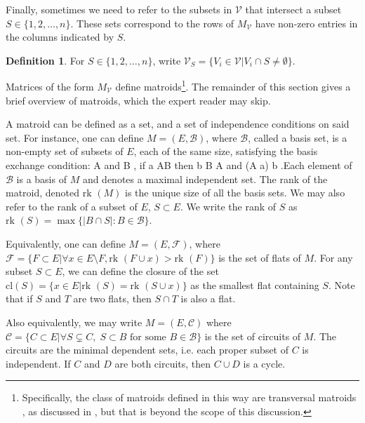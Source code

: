 \documentclass[11pt]{article}
\newcommand{\rk}{\textrm{rk }}
\def\bas #1\eas{\begin{align*} #1 \end{align*}}
\newcommand{\cV}{\mathcal{V}}
\newcommand{\cB}{\mathcal{B}}
\theoremstyle{remark}
\theoremstyle{definition}
\newtheorem{dfn}[thm]{Definition}
\begin{document}
Finally, sometimes we need to refer to the subsets in $\cV$ that intersect a subset  $S \in \{1,2,\dots,n\}$. These sets correspond to the rows of $M_{\cV}$ have non-zero entries in the columns indicated by $S$. 

\begin{dfn}\label{dfn:columns}
For $S \in \{1,2,\dots,n\}$, write $\cV_S =\{V_i \in \cV |  V_i \cap S \neq \emptyset\}$. 
\end{dfn}

Matrices of the form $M_\cV$ define matroids\footnote{Specifically, the class of matroids defined in this way are transversal matroids \cite{Transversal}, as discussed in \cite{basisshapeloci}, but that is beyond the scope of this discussion.}. The remainder of this section gives a brief overview of matroids, which the expert reader may skip. 

A matroid can be defined as a set, and a set of independence conditions on said set. For instance, one can define $M = (E, \mathcal{B})$, where $\mathcal{B}$, called a basis set, is a non-empty set of subsets of $E$, each of the same size, satisfying the basis exchange condition: \bas \textrm{for  all } A \textrm{ and } B \in \cB, \textrm{ if }  a \in A\setminus B \textrm{ then } \exists b \in B \setminus A \textrm{ and } (A \setminus a) \cup b \in  \cB \;.\eas Each element of $$ is a basis of $M$ and denotes a maximal independent set. The rank of the matroid, denoted $\rk(M)$ is the unique size of all the basis sets. We may also refer to the rank of a subset of $E$, $S \subset E$. We write the rank of $S$ as $\rk(S) = \max \{|B \cap S| : B \in \mathcal{B} \}$.%

Equivalently, one can define $M = (E, \mathcal{F})$, where $\mathcal{F} = \{ F \subset E| \forall x \in E \setminus F, \rk(F \cup x) > \rk(F)\}$ is the set of flats of $M$. For any subset $S \subset E$, we can define the closure of the set $\textrm{cl}(S)  = \{x \in E | \rk(S) = \rk(S \cup x)\}$ as the smallest flat containing $S$. Note that if $S$ and $T$ are two flats, then $S \cap T$ is also a flat. 

Also equivalently, we may write $M = (E, \mathcal{C})$ where $\mathcal{C} = \{C \subset E | \forall S \subsetneq C, \; S \subset B \textrm{ for some } B \in \mathcal{B}\}$ is the set of circuits of $M$. The circuits are the minimal dependent sets, i.e. each proper subset of $C$ is independent. If $C$ and $D$ are both circuits, then $C \cup D$ is a cycle. 
\end{document}
